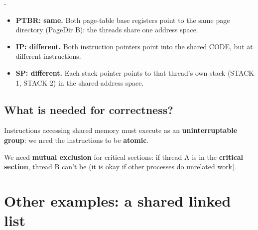 \documentclass[11pt,a4paper]{article}
\makeatletter
\newcommand{\keepspace}[1]{\par\penalty-100\begingroup
  \setlength{\dimen@}{#1}\dimen@ii\pagegoal\advance\dimen@ii-\pagetotal
  \ifdim\dimen@>\dimen@ii\ifdim\dimen@ii>\z@\vfil\fi\break\fi\endgroup}
\makeatother
\begin{document}
\keepspace{9\baselineskip}
\begin{solbox}
\begin{itemize}
  \item \textbf{PTBR: same.} Both page-table base registers point to the
        same page directory (PageDir B): the threads share one address space.
  \item \textbf{IP: different.} Both instruction pointers point into the
        shared CODE, but at different instructions.
  \item \textbf{SP: different.} Each stack pointer points to that thread's
        own stack (STACK 1, STACK 2) in the shared address space.
\end{itemize}
\end{solbox}

\subsection{What is needed for correctness?}

\begin{center}
\end{center}

Instructions accessing shared memory must execute as an
\textbf{uninterruptable group}: we need the instructions to be
\textbf{atomic}.

\begin{defbox}
We need \textbf{mutual exclusion} for critical sections: if thread A is in
the \textbf{critical section}, thread B can't be (it is okay if other
processes do unrelated work).
\end{defbox}

\section{Other examples: a shared linked list}
\end{document}
